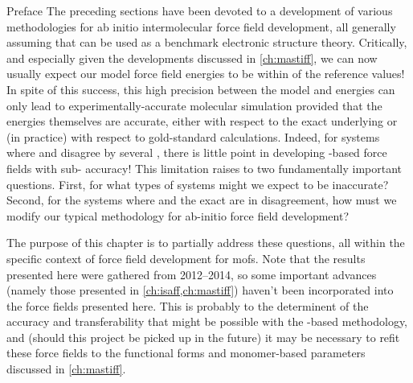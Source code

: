 \begin{section}{Preface}
The preceding sections have been devoted to a development of various methodologies for ab initio intermolecular force
field development, all generally assuming that \sapt can be used as a benchmark electronic structure
theory. Critically, and especially given the developments discussed in
\cref{ch:mastiff},
we can now usually expect our model force field energies to be within
 of the \sapt reference values! In spite of this
success, this high precision between the model
and \sapt energies can only lead to experimentally-accurate molecular simulation provided that the \sapt energies themselves are
accurate, either with respect to the exact underlying \pes or (in
practice)
with respect to gold-standard \ccsdt calculations. Indeed, for systems where \sapt
and \ccsdt disagree by several \kjmol{}, there is little point in developing
\sapt-based force fields with sub-\kjmol{} accuracy! This limitation raises to two
fundamentally important questions. 
First, for what types of systems might we expect \sapt to be inaccurate? Second,
for the systems where \sapt and the exact \pes are in disagreement, how
must we modify our typical methodology for ab-initio force field development?

The purpose of this chapter is to partially address these questions, all
within the specific context of 
force field development for \glspl{mof}. Note that the results presented here were
gathered from 2012--2014, so some important advances (namely those
presented in \cref{ch:isaff,ch:mastiff}) haven't been incorporated into
the force fields presented here. This is probably to the determinent of the accuracy and
transferability that might be possible with the \lmoeda-based methodology, and
(should this project be picked up in the future) it may be necessary to
refit these force fields to the functional forms and monomer-based parameters
discussed in \cref{ch:mastiff}.


\end{section}

